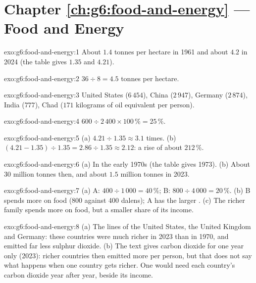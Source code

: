 \section*{Chapter \ref{ch:g6:food-and-energy} --- Food and Energy}

\begin{solution}{exo:g6:food-and-energy:1}
About $1.4$ tonnes per hectare in 1961 and about $4.2$ in 2024 (the table gives
$1.35$ and $4.21$).
\end{solution}

\begin{solution}{exo:g6:food-and-energy:2}
$36 \div 8 = 4.5$ tonnes per hectare.
\end{solution}

\begin{solution}{exo:g6:food-and-energy:3}
United States ($6\,454$), China ($2\,947$), Germany ($2\,874$), India ($777$), Chad
($171$ kilograms of oil equivalent per person).
\end{solution}

\begin{solution}{exo:g6:food-and-energy:4}
$600 \div 2\,400 \times 100\,\% = 25\,\%$.
\end{solution}

\begin{solution}{exo:g6:food-and-energy:5}
(a) $4.21 \div 1.35 \approx 3.1$ times. (b) $(4.21 - 1.35) \div 1.35 = 2.86 \div 1.35
\approx 2.12$: a rise of about $212\,\%$.
\end{solution}

\begin{solution}{exo:g6:food-and-energy:6}
(a) In the early 1970s (the table gives 1973). (b) About 30 million tonnes then,
and about $1.5$ million tonnes in 2023.
\end{solution}

\begin{solution}{exo:g6:food-and-energy:7}
(a) A: $400 \div 1\,000 = 40\,\%$; B: $800 \div 4\,000 = 20\,\%$. (b) B spends more on
food (800 against 400 dalens); A has the larger . (c) The richer family
spends more on food, but a smaller share of its income.
\end{solution}

\begin{solution}{exo:g6:food-and-energy:8}
(a) The lines of the United States, the United Kingdom and Germany: these countries
were much richer in 2023 than in 1970, and emitted far less sulphur dioxide. (b) The
text gives carbon dioxide for one year only (2023): richer countries then emitted
more per person, but that does not say what happens when one country gets richer.
One would need each country's carbon dioxide year after year, beside its income.
\end{solution}

